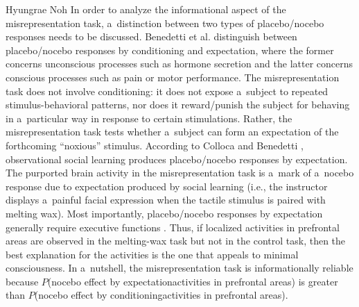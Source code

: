 \begin{artengenv}{Hyungrae Noh}
In order to analyze the informational aspect of the misrepresentation task, a~distinction between two types of placebo/nocebo responses needs to be discussed. Benedetti et al.
\parencite*[][]{benedetti_conscious_2003} %
 distinguish between placebo/nocebo responses by conditioning and expectation, where the former concerns unconscious processes such as hormone secretion and the latter concerns conscious processes such as pain or motor performance. The misrepresentation task does not involve conditioning: it does not expose a~subject to repeated stimulus-behavioral patterns, nor does it reward/punish the subject for behaving in a~particular way in response to certain stimulations. Rather, the misrepresentation task tests whether a~subject can form an expectation of the forthcoming ``noxious'' stimulus. According to Colloca and Benedetti 
\parencite*[][]{colloca_placebo_2009}, %
 observational social learning produces placebo/nocebo responses by expectation. The purported brain activity in the misrepresentation task is a~mark of a~nocebo response due to expectation produced by social learning (i.e., the instructor displays a~painful facial expression when the tactile stimulus is paired with melting wax). Most importantly, placebo/nocebo responses by expectation generally require executive functions 
\parencite[][p.239]{benedetti_how_2011}. %
 Thus, if localized activities in prefrontal areas are observed in the melting-wax task but not in the control task, then the best explanation for the activities is the one that appeals to minimal consciousness. In a~nutshell, the misrepresentation task is informationally reliable because $P$(nocebo effect by expectation{\textbar}activities in prefrontal areas) is greater than $P$(nocebo effect by conditioning{\textbar}activities in prefrontal areas).


\end{artengenv}
